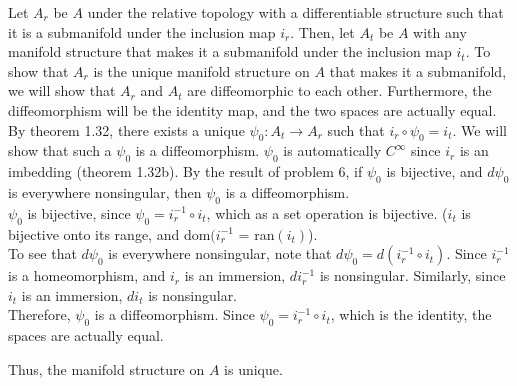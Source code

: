 \documentclass[paper=a4, fontsize=11pt]{scrartcl} %
\numberwithin{equation}{section} %
\numberwithin{figure}{section} %
\numberwithin{table}{section} %
\begin{document}
Let $A_r$ be $A$ under the relative topology with a differentiable structure such that it is a submanifold under the inclusion map $i_r$.
Then, let $A_t$ be $A$ with any manifold structure that makes it a submanifold under the inclusion map $i_t$. 
To show that $A_r$ is the unique manifold structure on $A$ that makes it a submanifold, we will show that $A_r$ and $A_t$ are diffeomorphic to each other. Furthermore, the diffeomorphism will be the identity map, and the two spaces are actually equal.\\

By theorem 1.32, there exists a unique $\psi_0: A_t \to A_r$ such that $i_r \circ \psi_0 = i_t$.
We will show that such a $\psi_0$ is a diffeomorphism. $\psi_0$ is automatically $C^{\infty}$ since $i_r$ is an imbedding (theorem 1.32b). 
By the result of problem 6, if $\psi_0$ is bijective, and $d\psi_0$ is everywhere nonsingular, then $\psi_0$ is a diffeomorphism.\\
$\psi_0$ is bijective, since $\psi_0 = i_r^{-1} \circ i_t$, which as a set operation is bijective. 
($i_t$ is bijective onto its range, and dom$(i_r^{-1}$ = ran$(i_t)$).\\

To see that $d\psi_0$ is everywhere nonsingular, note that $d\psi_0 = d(i_r^{-1} \circ i_t)$. Since $i_r^{-1}$ is a homeomorphism, and $i_r$ is an immersion, $di_r^{-1}$ is nonsingular. Similarly, since $i_t$ is an immersion, $di_t$ is nonsingular.\\

Therefore, $\psi_0$ is a diffeomorphism. Since $\psi_0 = i_r^{-1} \circ i_t$, which is the identity, the spaces are actually equal. 

Thus, the manifold structure on $A$ is unique.
\end{document}
